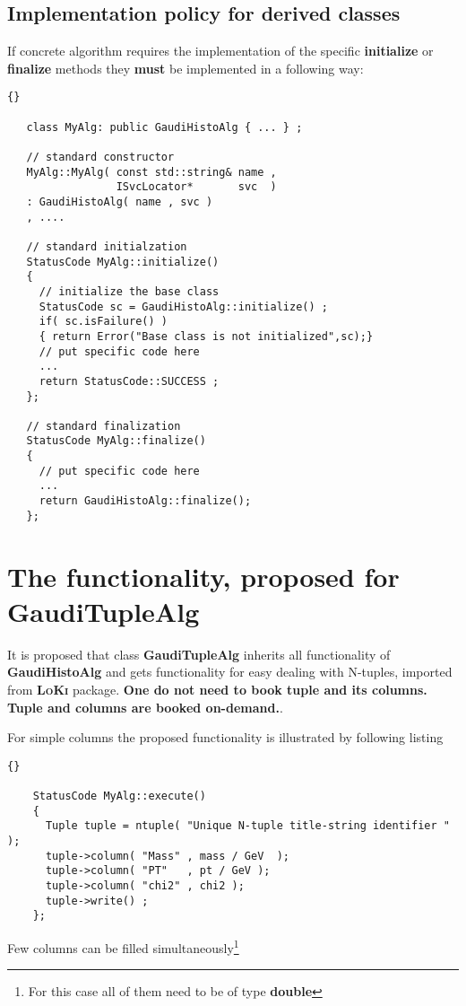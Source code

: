 \documentclass{lhcbnote}
\newcommand{\bftt}         {\ttfamily\bfseries}
\newcommand{\scbf}         {\scshape\bfseries}
\begin{document}
\section{Implementation policy for derived classes}
If concrete algorithm requires the implementation of
the specific {\bftt{initialize}} or
{\bftt{finalize}} methods they {\bftt{must}} be implemented
in a following way:

\begin{scriptsize}
 \begin{lstlisting}{}

   class MyAlg: public GaudiHistoAlg { ... } ;

   // standard constructor
   MyAlg::MyAlg( const std::string& name ,
                 ISvcLocator*       svc  )
   : GaudiHistoAlg( name , svc )
   , ....

   // standard initialzation
   StatusCode MyAlg::initialize()
   {
     // initialize the base class
     StatusCode sc = GaudiHistoAlg::initialize() ;
     if( sc.isFailure() )
     { return Error("Base class is not initialized",sc);}
     // put specific code here
     ...
     return StatusCode::SUCCESS ;
   };

   // standard finalization
   StatusCode MyAlg::finalize()
   {
     // put specific code here
     ...
     return GaudiHistoAlg::finalize();
   };

 \end{lstlisting}
\end{scriptsize}


\chapter{The functionality, proposed for {\bftt{GaudiTupleAlg}}}
It is proposed that  class {\bftt{GaudiTupleAlg}} inherits
all functionality of {\bftt{GaudiHistoAlg}} and gets functionality
for easy dealing with N-tuples,
imported from {\scbf{LoKi}} package. {\bf{One do not need to book tuple and its columns.
Tuple and columns are booked on-demand.}}.


For simple columns the proposed functionality is
illustrated by following listing

\begin{scriptsize}
  \begin{lstlisting}{}

    StatusCode MyAlg::execute()
    {
      Tuple tuple = ntuple( "Unique N-tuple title-string identifier " );
      tuple->column( "Mass" , mass / GeV  );
      tuple->column( "PT"   , pt / GeV );
      tuple->column( "chi2" , chi2 );
      tuple->write() ;
    };

  \end{lstlisting}
\end{scriptsize}
Few columns can be filled simultaneously\footnote{For this case
all of them need to be of type {\bftt{double}}}
\end{document}
